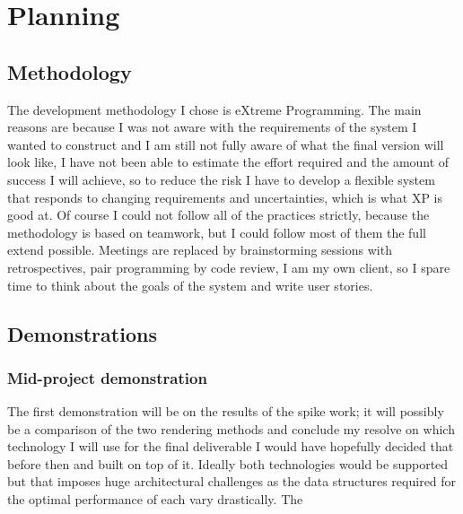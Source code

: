\documentclass[11pt,fleqn,twoside]{article}
\begin{document}
\section{Planning}

\subsection{Methodology}

The development methodology I chose is eXtreme Programming. The main reasons are because I was not aware with the requirements of the system I wanted to construct and I am still not fully aware of what the final version will look like, I have not been able to estimate the effort required and the amount of success I will achieve, so to reduce the risk I have to develop a flexible system that responds to changing requirements and uncertainties, which is what XP is good at. Of course I could not follow all of the practices strictly, because the methodology is based on teamwork, but I could follow most of them the full extend possible.
Meetings are replaced by brainstorming sessions with retrospectives, pair programming by code review, I am my own client, so I spare time to think about the goals of the system and write user stories.

\subsection{Demonstrations}

\subsubsection{Mid-project demonstration}
The first demonstration will be on the results of the spike work; it will possibly be a comparison of the two rendering methods and conclude my resolve on which technology I will use for the final deliverable I would have hopefully decided that before then and built on top of it. Ideally both technologies would be supported but that imposes huge architectural challenges as the data structures required for the optimal performance of each vary drastically.
The 
\end{document}
